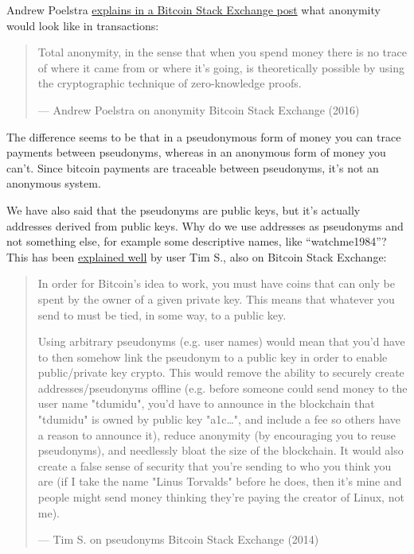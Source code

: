 Andrew Poelstra
\href{https://bitcoin.stackexchange.com/a/29473/69518}{explains in a
Bitcoin Stack Exchange post} what anonymity would look like in
transactions:

\begin{quote}
Total anonymity, in the sense that when you spend money there is no
trace of where it came from or where it's going, is theoretically
possible by using the cryptographic technique of zero-knowledge proofs.

---  Andrew Poelstra on anonymity Bitcoin Stack Exchange (2016)
\end{quote}

The difference seems to be that in a pseudonymous form of money you can
trace payments between pseudonyms, whereas in an anonymous form of money
you can't. Since bitcoin payments are traceable between pseudonyms, it's
not an anonymous system.

We have also said that the pseudonyms are public keys, but it's actually
addresses derived from public keys. Why do we use addresses as
pseudonyms and not something else, for example some descriptive names,
like ``watchme1984''? This has been
\href{https://bitcoin.stackexchange.com/a/25175/69518}{explained well}
by user Tim S., also on Bitcoin Stack Exchange:

\begin{quote}
In order for Bitcoin's idea to work, you must have coins that can only
be spent by the owner of a given private key. This means that whatever
you send to must be tied, in some way, to a public key.

Using arbitrary pseudonyms (e.g. user names) would mean that you'd have
to then somehow link the pseudonym to a public key in order to enable
public/private key crypto. This would remove the ability to securely
create addresses/pseudonyms offline (e.g. before someone could send
money to the user name "tdumidu", you'd have to announce in the
blockchain that "tdumidu" is owned by public key
"a1c\ldots\hspace{0pt}", and include a fee so others have a reason to
announce it), reduce anonymity (by encouraging you to reuse pseudonyms),
and needlessly bloat the size of the blockchain. It would also create a
false sense of security that you're sending to who you think you are (if
I take the name "Linus Torvalds" before he does, then it's mine and
people might send money thinking they're paying the creator of Linux,
not me).

---  Tim S. on pseudonyms Bitcoin Stack Exchange (2014)
\end{quote}

